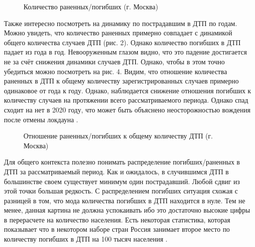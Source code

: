 \documentclass[a4paper, 14pt]{article}
\begin{document}
\begin{figure}[h]
	\caption{Количество раненных/погибших (г. Москва)}
\end{figure}

Также интересно посмотреть на динамику по пострадавшим в ДТП по годам. Можно увидеть, что количество раненных примерно совпадает с динамикой общего количества случаев ДТП (рис. 2). Однако количество погибших в ДТП падает из года в год. Невооруженным глазом видно, что это падение достигается не за счёт снижения динамики случаев ДТП. Однако, чтобы в этом точно убедиться можно посмотреть на рис. 4. Видим, что отношение количества раненных в ДТП к общему количеству зарегистрированных случаев примерно одинаковое от года к году. Однако, наблюдается снижение отношения погибших к количеству случаев на протяжении всего рассматриваемого периода. Однако спад сходит на нет в 2020 году, что может быть объяснено неосторожностью вождения после отмены локдауна \cite{rbkNews}. 

\begin{figure}[h]
	\caption{Отношение раненных/погибших к общему количеству ДТП (г. Москва)}
\end{figure}


Для общего контекста полезно понимать распределение погибших/раненных в ДТП за рассматриваемый период. Как и ожидалось, в случившимся ДТП в большинстве своем существует минимум один пострадавший. Любой сдвиг из этой точки большая редкость. С распределением погибших ситуация схожая с разницей в том, что мода количества погибших в ДТП находится в нуле. Тем не менее, данная картина не должна успокаивать ибо это достаточно высокие цифры в перерасчете на количество населения. Есть некоторая статистика, которая показывает что в некотором наборе стран Россия занимает второе место по количеству погибших в ДТП на 100 тысяч населения \cite{tass_rating}. 
\end{document}
